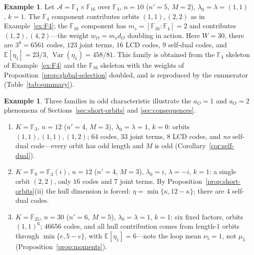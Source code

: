 \documentclass[preprint,12pt,a4paper]{elsarticle}
\newcommand{\F}{\mathbb F}
\newcommand{\A}{\mathcal A}
\theoremstyle{definition}
\newtheorem{example}[theorem]{Example}
\theoremstyle{remark}
\begin{document}
\begin{example}\label{ex:mixed}
Let $\A=\F_4\times\F_{16}$ over $\F_4$, $n=10$ ($n'=5$, $M=2$),
$\lambda_0=\lambda=(1,1)$, $k=1$.  The $\F_4$ component contributes orbits
$(1,1),(2,2)$ as in Example~\ref{ex:F4}; the $\F_{16}$ component has
$m_s=[\F_{16}:\F_4]=2$ and contributes $(1,2),(4,2)$---the weight
$w_O=m_sd_O$ doubling in action.  Here $W=30$, there are $3^8=6561$ codes,
$123$ joint terms, $16$ LCD codes, $9$ self-dual codes, and
$\mathbb{E}[\eta_1]=23/3$, $\operatorname{Var}(\eta_1)=458/81$.  This family
is obtained from the $\F_4$ skeleton of Example~\ref{ex:F4} and the
$\F_{16}$ skeleton with the weights of Proposition~\ref{prop:global-selection}
doubled, and is reproduced by the enumerator (Table~\ref{tab:summary}).
\end{example}

\begin{example}\label{ex:char35}
Three families in odd characteristic illustrate the $a_O=1$ and $a_O=2$
phenomena of Sections~\ref{sec:short-orbits} and
\ref{sec:consequences}.
\begin{enumerate}
\item[\textup{(a)}] $K=\F_3$, $n=12$ ($n'=4$, $M=3$), $\lambda_0=\lambda=1$,
$k=0$: orbits $(1,1),(1,1),(1,2)$; $64$ codes, $33$ joint terms, $8$ LCD
codes, and \emph{no} self-dual code---every orbit has odd length and $M$
is odd (Corollary~\ref{cor:self-dual}).
\item[\textup{(b)}] $K=\F_9=\F_3(i)$, $n=12$ ($n'=4$, $M=3$),
$\lambda_0=i$, $\lambda=-i$, $k=1$: a single orbit $(2,2)$, only $16$ codes
and $7$ joint terms.  By Proposition~\ref{prop:short-orbits}(ii) the hull
dimension is forced: $\eta=\min\{\kappa,12-\kappa\}$; there are $4$ self-dual
codes.
\item[\textup{(c)}] $K=\F_{25}$, $n=30$ ($n'=6$, $M=5$),
$\lambda_0=\lambda=1$, $k=1$: six fixed factors, orbits $(1,1)^6$; $46656$
codes, and all hull contribution comes from length-$1$ orbits through
$\min\{e,5-e\}$, with $\mathbb{E}[\eta_1]=6$---note the loop mean
$\nu_5=1$, not $\mu_5$ (Proposition~\ref{prop:moments}).
\end{enumerate}
\end{example}
\end{document}
